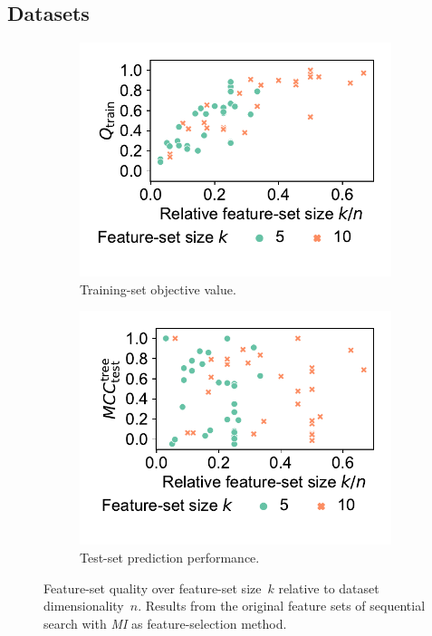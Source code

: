 \documentclass{article}
\theoremstyle{definition}
\begin{document}
\subsection{Datasets}
\label{sec:afs:evaluation:datasets}

\begin{figure}[htb]
	\centering
	\begin{subfigure}[t]{0.48\textwidth}
		\centering
		\includegraphics[width=\textwidth, trim=15 30 15 15, clip]{plots/afs-impact-dataset-k-train-objective.pdf}
		\caption{Training-set objective value.}
		\label{fig:afs:impact-dataset-k-train-objective}
	\end{subfigure}
	\hfill
	\begin{subfigure}[t]{0.48\textwidth}
		\centering
		\includegraphics[width=\textwidth, trim=15 30 15 15, clip]{plots/afs-impact-dataset-k-decision-tree-test-mcc.pdf}
		\caption{Test-set prediction performance.}
		\label{fig:afs:impact-dataset-k-decision-tree-test-mcc}
	\end{subfigure}
	\caption{
		Feature-set quality over feature-set size~$k$ relative to dataset dimensionality~$n$.
		Results from the original feature sets of sequential search with \emph{MI} as feature-selection method.
	}
	\label{fig:afs:impact-dataset-k-quality}
\end{figure}
\end{document}
